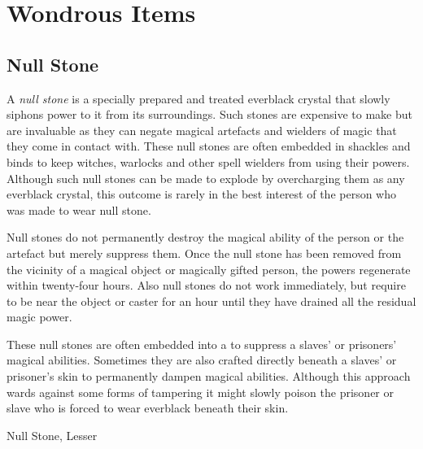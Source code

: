 \section{Wondrous Items}
\label{sec:Wondrous Items}

\subsection{Null Stone}
\label{sec:Null Stone}

A \emph{null stone} is a specially prepared and treated everblack crystal that
slowly siphons power to it from its surroundings. Such stones are expensive to
make but are invaluable as they can negate magical artefacts and wielders of
magic that they come in contact with. These null stones are often embedded in
shackles and binds to keep witches, warlocks and other spell wielders from
using their powers. Although such null stones can be made to explode by
overcharging them as any everblack crystal, this outcome is rarely in the best
interest of the person who was made to wear null stone.

Null stones do not permanently destroy the magical ability of the person or
the artefact but merely suppress them. Once the null stone has been removed
from the vicinity of a magical object or magically gifted person, the powers
regenerate within twenty-four hours. Also null stones do not work immediately,
but require to be near the object or caster for an hour until they have
drained all the residual magic power.

These null stones are often embedded into a  to
suppress a slaves' or prisoners' magical abilities. Sometimes they are also
crafted directly beneath a slaves' or prisoner's skin to permanently dampen
magical abilities. Although this approach wards against some forms of tampering
it might slowly poison the prisoner or slave who is forced to wear everblack
beneath their skin.

\begin{35e}{Null Stone, Lesser}
\end{35e}

